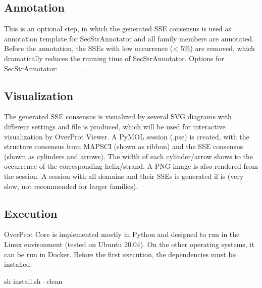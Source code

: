 \documentclass{article}
\begin{document}
\subsection{Annotation}

This is an optional step, in which the generated SSE consensus is used
as annotation template for SecStrAnnotator and all family members are
annotated. Before the annotation, the SSEs with low occurrence
(\textless{} 5\%) are removed, which dramatically reduces the running
time of SecStrAnnotator. Options for SecStrAnnotator:
 ~
~ ~
~.



\subsection{Visualization}

The generated SSE consensus is visualized by several SVG diagrams with
different settings and  file is produced, which
will be used for interactive visualization by OverProt Viewer. A PyMOL
session (.pse) is created, with the structure consensus from MAPSCI
(shown as ribbon) and the SSE consensus (shown as cylinders and arrows).
The width of each cylinder/arrow shows to the occurrence of the corresponding helix/strand.
A PNG image is also rendered from the session. 
A session with all domains and their SSEs is
generated if  is
 (very slow, not recommended for larger families).



\subsection{Execution}

OverProt Core is implemented mostly in Python 
and designed to run in the Linux environment (tested on Ubuntu 20.04).
On the other operating systems, it can be run in Docker.
Before the first execution, the dependencies must be installed:

\begin{codeblock}
  sh install.sh --clean
\end{codeblock}
\end{document}
